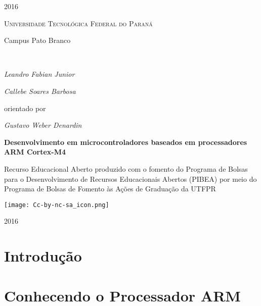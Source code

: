 \documentclass[a4paper,10pt,oneside]{book}
\begin{document}
\begin{titlepage}
	{\large2016\par}
	\newpage
 \vfill
  \begin{center}
   {\scshape \LARGE Universidade Tecnológica Federal do Paraná\par\vspace{5pt} \Large Campus Pato Branco} \\[2.5cm]

   \begin{minipage}{\textwidth}
		\centering
		\Large\itshape Leandro Fabian Junior\par
		\Large\itshape Callebe Soares Barbosa\par
	\end{minipage}
	\vspace{1cm}
	
	{orientado por\par
	\Large\itshape Gustavo Weber Denardin}
	\vfill

   {\huge\bfseries Desenvolvimento em microcontroladores baseados em processadores ARM Cortex-M4\par}
   \vfill

   \hspace{.45\textwidth} %
   \begin{minipage}{.5\textwidth}
   \large Recurso Educacional Aberto produzido com o fomento do Programa de Bolsas para o Desenvolvimento de Recursos Educacionais Abertos (PIBEA) por meio do Programa de Bolsas de Fomento às Ações de Graduação da UTFPR
  \end{minipage}
  \vfill
  \hspace{11cm}
  \texttt{[image: Cc-by-nc-sa\_icon.png]}
	
\vspace{2cm}

{\large2016\par}
\end{center}
\end{titlepage} 

\setcounter{page}{2}
\listoffigures
\listoftables

\dominitoc
\nomtcrule
\tableofcontents

\chapter{Introdução}


\chapter{Conhecendo o Processador ARM}

\end{document}
